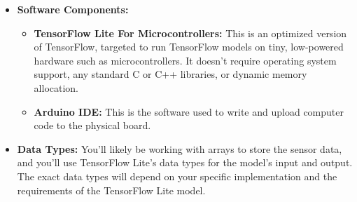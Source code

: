 \begin{itemize}
	
	\item \textbf{Software Components:}
	\begin{itemize}
		\item \textbf{TensorFlow Lite For Microcontrollers:} This is an optimized version of TensorFlow, targeted to run TensorFlow models on tiny, low-powered hardware such as microcontrollers. It doesn't require operating system support, any standard C or C++ libraries, or dynamic memory allocation.
		\item \textbf{Arduino IDE:} This is the software used to write and upload computer code to the physical board.
	\end{itemize}
	
	\item \textbf{Data Types:} You'll likely be working with arrays to store the sensor data, and you'll use TensorFlow Lite's data types for the model's input and output. The exact data types will depend on your specific implementation and the requirements of the TensorFlow Lite model.
\end{itemize}


